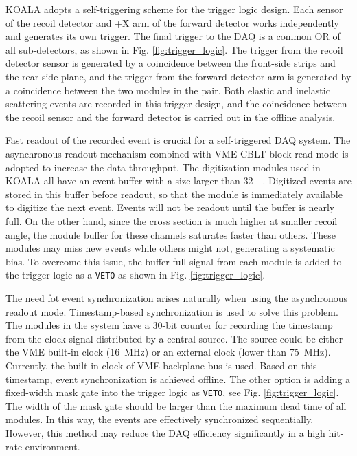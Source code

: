 \documentclass[number,5p]{elsarticle}
\begin{document}
KOALA adopts a self-triggering scheme for the trigger logic design.
Each sensor of the recoil detector and +X arm of the forward detector works independently and generates its own trigger. 
The final trigger to the DAQ is a common OR of all sub-detectors, as shown in Fig. \ref{fig:trigger_logic}.
The trigger from the recoil detector sensor is generated by a coincidence between the front-side strips and the rear-side plane, 
and the trigger from the forward detector arm is generated by a coincidence between the two modules in the pair.
Both elastic and inelastic scattering events are recorded in this trigger
design, and the coincidence between the recoil sensor and the forward detector
is carried out in the offline analysis.

Fast readout of the recorded event is crucial for a self-triggered DAQ system.
The asynchronous readout mechanism combined with VME CBLT block read mode is adopted to increase the data throughput.
The digitization modules used in KOALA all have an event buffer with a size
larger than \SI{32}{\kibi\byte}.
Digitized events are stored in this buffer before readout, so that the module is immediately available to digitize the next event.
Events will not be readout until the buffer is nearly full.
On the other hand, since the cross section is much higher at smaller recoil
angle, the module buffer for these channels saturates faster than others.
These modules may miss new events while others might not, generating a systematic bias.
To overcome this issue, the buffer-full signal from each module is added to the
trigger logic as a \texttt{VETO} as shown in Fig. \ref{fig:trigger_logic}.

The need fot event synchronization arises naturally when using the asynchronous
readout mode.
Timestamp-based synchronization is used to solve this problem.
The modules in the system have a 30-bit counter for recording the timestamp from
the clock signal distributed by a central source.
The source could be either the VME built-in clock (\SI{16}{\MHz}) or an external clock
(lower than \SI{75}{\MHz}).
Currently, the built-in clock of VME backplane bus is used. 
Based on this timestamp, event synchronization is achieved offline.
The other option is adding a fixed-width mask gate into the trigger logic as \texttt{VETO}, see Fig. \ref{fig:trigger_logic}.
The width of the mask gate should be larger than the maximum dead time of all modules.
In this way, the events are effectively synchronized sequentially. 
However, this method may reduce the DAQ efficiency significantly in a high hit-rate environment.
\end{document}
